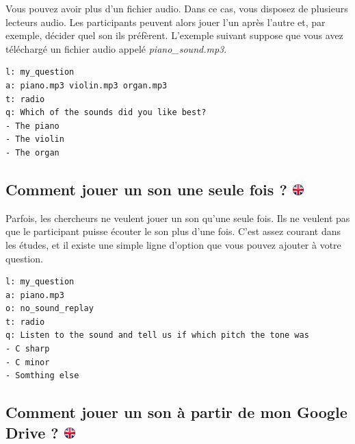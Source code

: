 \documentclass[
]{book}
\begin{document}
Vous pouvez avoir plus d'un fichier audio. Dans ce cas, vous disposez de plusieurs lecteurs audio. Les participants peuvent alors jouer l'un après l'autre et, par exemple, décider quel son ils préfèrent. L'exemple suivant suppose que vous avez téléchargé un fichier audio appelé \emph{piano\_sound.mp3}.

\begin{verbatim}
l: my_question
a: piano.mp3 violin.mp3 organ.mp3
t: radio
q: Which of the sounds did you like best?
- The piano
- The violin
- The organ
\end{verbatim}

\hypertarget{comment-jouer-un-son-une-seule-fois}{%
\subsection[Comment jouer un son une seule fois ? ]{\texorpdfstring{Comment jouer un son une seule fois ? \href{https://www.psytoolkit.org/lessons/surveyaudiovideo.html\#_how_to_play_a_sound_only_one_time}{\protect\includegraphics{img/ukflag.png}}}{Comment jouer un son une seule fois ? }}\label{comment-jouer-un-son-une-seule-fois}}

Parfois, les chercheurs ne veulent jouer un son qu'une seule fois. Ils ne veulent pas que le participant puisse écouter le son plus d'une fois. C'est assez courant dans les études, et il existe une simple ligne d'option que vous pouvez ajouter à votre question.

\begin{verbatim}
l: my_question
a: piano.mp3
o: no_sound_replay
t: radio
q: Listen to the sound and tell us if which pitch the tone was
- C sharp
- C minor
- Somthing else
\end{verbatim}

\hypertarget{comment-jouer-un-son-uxe0-partir-de-mon-google-drive}{%
\subsection[Comment jouer un son à partir de mon Google Drive ? ]{\texorpdfstring{Comment jouer un son à partir de mon Google Drive ? \href{https://www.psytoolkit.org/lessons/surveyaudiovideo.html\#_how_to_play_a_sound_from_my_google_drive}{\protect\includegraphics{img/ukflag.png}}}{Comment jouer un son à partir de mon Google Drive ? }}\label{comment-jouer-un-son-uxe0-partir-de-mon-google-drive}}
\end{document}
